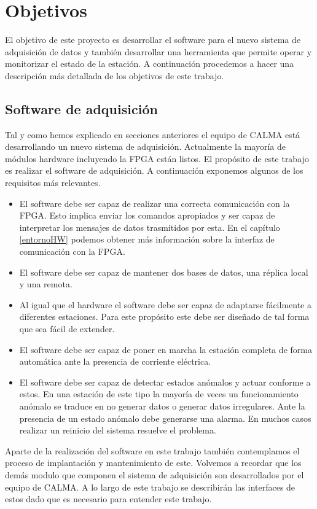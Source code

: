 \section{Objetivos}
	El objetivo de este proyecto es desarrollar el software para el nuevo sistema de adquisición de datos y también desarrollar una herramienta
	que permite operar y monitorizar el estado de la estación. A continuación procedemos a hacer una descripción más detallada de los objetivos de
	este trabajo.  
	\subsection{Software de adquisición}
		Tal y como hemos explicado en secciones anteriores el equipo de CALMA está desarrollando un nuevo sistema de adquisición. Actualmente
		la mayoría de módulos hardware incluyendo la FPGA están listos. El propósito de este trabajo es realizar el software de adquisición. A
		continuación exponemos algunos de los requisitos más relevantes.
		\begin{itemize}
			\item 	El software debe ser capaz de realizar una correcta comunicación con la FPGA. Esto implica enviar los comandos
				apropiados y ser capaz de interpretar los mensajes de datos trasmitidos por esta. En el capítulo \ref{entornoHW}
				podemos obtener más información sobre la interfaz de comunicación con la FPGA.
			\item 	El software debe ser capaz de mantener dos bases de datos, una réplica local y una remota.
			\item 	Al igual que el hardware el software debe ser capaz de adaptarse fácilmente a diferentes estaciones. Para este
				propósito este debe ser diseñado de tal forma que sea fácil de extender.
			\item 	El software debe ser capaz de poner en marcha la estación completa de forma automática ante la presencia de corriente
			  	eléctrica. 
			\item 	El software debe ser capaz de detectar estados anómalos y actuar conforme a estos. En una estación de este tipo la
				mayoría de veces un funcionamiento anómalo se traduce en no generar datos o generar datos irregulares. Ante la
				presencia de un estado anómalo debe generarse una alarma. En muchos casos realizar un reinicio del sistema resuelve el
				problema.
		\end{itemize}
		Aparte de la realización del software en este trabajo también contemplamos el proceso de implantación y mantenimiento de este.
		Volvemos a recordar que los demás modulo que componen el sistema de adquisición son desarrollados por el equipo de CALMA. A lo largo
		de este trabajo se describirán las interfaces de estos dado que es necesario para entender este trabajo. 
